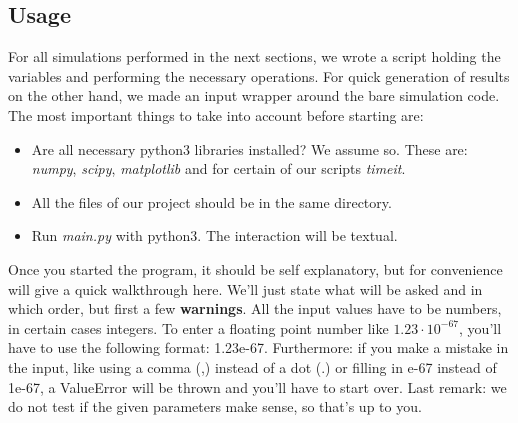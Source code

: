 \documentclass[11pt, a4paper]{article}
\begin{document}
\subsection{Usage} %

For all simulations performed in the next sections, we wrote a script holding the variables and performing the necessary operations. For quick generation of results on the other hand, we made an input wrapper around the bare simulation code. The most important things to take into account before starting are:
\begin{itemize}
    \item Are all necessary python3 libraries installed? We assume so. These are: \emph{numpy}, \emph{scipy}, \emph{matplotlib} and for certain of our scripts \emph{timeit}.
    \item All the files of our project should be in the same directory.
    \item Run \emph{main.py} with python3. The interaction will be textual.
\end{itemize}{}
Once you started the program, it should be self explanatory, but for convenience will give a quick walkthrough here. We'll just state what will be asked and in which order, but first a few \textbf{warnings}.
All the input values have to be numbers, in certain cases integers. To enter a floating point number like $1.23\cdot10^{-67}$, you'll have to use the following format: 1.23e-67.
Furthermore: if you make a mistake in the input, like using a comma (,) instead of a dot (.) or filling in e-67 instead of 1e-67, a ValueError will be thrown and you'll have to start over.
Last remark: we do not test if the given parameters make sense, so that's up to you.
\end{document}
